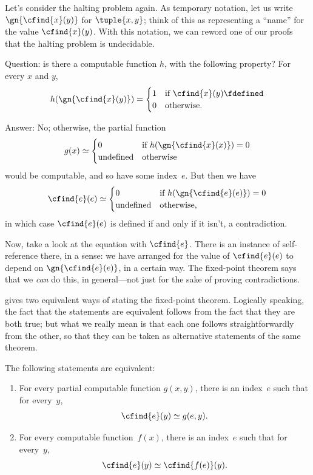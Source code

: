 \documentclass[../../../include/open-logic-section]{subfiles}
\begin{document}

Let's consider the halting problem again. As temporary
notation, let us write $\gn{\cfind{x}(y)}$ for $\tuple{x, y}$; think of
this as representing a ``name'' for the value $\cfind{x}(y)$. With this
notation, we can reword one of our proofs that the halting problem is
undecidable.

Question: is there a computable function $h$, with the
following property? For every $x$ and $y$,
\[
h(\gn{\cfind{x}(y)}) =
\begin{cases}
1 & \text{if $\cfind{x}(y) \fdefined$} \\
0 & \text{otherwise.}
\end{cases}
\]

Answer: No; otherwise, the partial function
\[
g(x) \simeq
\begin{cases}
0 & \text{if $h(\gn{\cfind{x}(x)}) = 0$} \\
\text{undefined} & \text{otherwise}
\end{cases}
\]
would be computable, and so have some index~$e$. But then we have
\[
\cfind{e}(e) \simeq
\begin{cases}
0 & \text{if $h(\gn{\cfind{e}(e)}) = 0$} \\
\text{undefined} & \text{otherwise,}
\end{cases}
\]
in which case $\cfind{e}(e)$ is defined if and only if it isn't, a
contradiction.

Now, take a look at the equation with $\cfind{e}$. There is an instance of
self-reference there, in a sense: we have arranged for the value of
$\cfind{e}(e)$ to depend on $\gn{\cfind{e}(e)}$, in a certain way. The
fixed-point theorem says that we {\em can} do this, in general---not
just for the sake of proving contradictions.

 gives two equivalent ways of stating the
fixed-point theorem. Logically speaking, the fact that the statements
are equivalent follows from the fact that they are both true; but what
we really mean is that each one follows straightforwardly from the
other, so that they can be taken as alternative statements of the same
theorem.

\begin{lem}
The following statements are equivalent:
\begin{enumerate}
\item For every partial computable function $g(x,y)$, there is an
  index~$e$ such that for every~$y$,
\[
\cfind{e}(y) \simeq g(e,y).
\]
\item For every computable function~$f(x)$, there is an index~$e$ such
  that for every~$y$,
\[
\cfind{e}(y) \simeq \cfind{f(e)}(y).
\]
\end{enumerate}
\end{lem}
\end{document}
